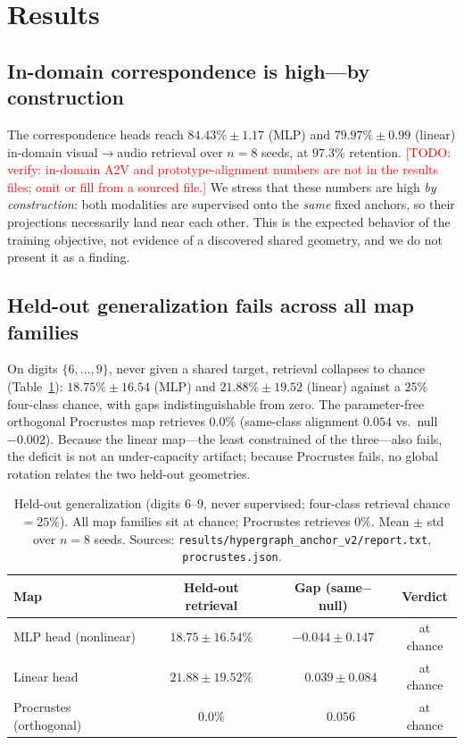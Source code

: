 \documentclass[conference]{IEEEtran}
\newcommand{\todo}[1]{\textcolor{red}{[TODO: #1]}}
\begin{document}
\section{Results}\label{sec:results}
\subsection{In-domain correspondence is high---by construction}
The correspondence heads reach $84.43\%\pm1.17$ (MLP) and $79.97\%\pm0.99$
(linear) in-domain visual$\to$audio retrieval over $n{=}8$ seeds, at
$97.3\%$ retention. \todo{verify: in-domain A2V and prototype-alignment
numbers are not in the results files; omit or fill from a sourced file.}
We stress that these numbers are high \emph{by construction}: both
modalities are supervised onto the \emph{same} fixed anchors, so their
projections necessarily land near each other. This is the expected behavior
of the training objective, not evidence of a discovered shared geometry, and
we do not present it as a finding.

\subsection{Held-out generalization fails across all map families}
On digits $\{6,\dots,9\}$, never given a shared target, retrieval collapses
to chance (Table~\ref{tab:heldout}): $18.75\%\pm16.54$ (MLP) and
$21.88\%\pm19.52$ (linear) against a $25\%$ four-class chance, with gaps
indistinguishable from zero. The parameter-free orthogonal Procrustes map
retrieves $0.0\%$ (same-class alignment $0.054$ vs.\ null $-0.002$). Because
the linear map---the least constrained of the three---also fails, the
deficit is not an under-capacity artifact; because Procrustes fails, no
global rotation relates the two held-out geometries.

\begin{table}[t]
\centering
\caption{Held-out generalization (digits $6$--$9$, never supervised; four-class
retrieval chance $=25\%$). All map families sit at chance; Procrustes
retrieves $0\%$. Mean $\pm$ std over $n{=}8$ seeds. Sources:
\texttt{results/hypergraph\_anchor\_v2/report.txt}, \texttt{procrustes.json}.}
\label{tab:heldout}
\begin{tabular}{lccc}
\toprule
Map & Held-out retrieval & Gap (same$-$null) & Verdict \\
\midrule
MLP head (nonlinear)    & $18.75 \pm 16.54\%$ & $-0.044 \pm 0.147$ & at chance \\
Linear head             & $21.88 \pm 19.52\%$ & $\phantom{-}0.039 \pm 0.084$ & at chance \\
Procrustes (orthogonal) & $0.0\%$             & $\phantom{-}0.056$           & at chance \\
\bottomrule
\end{tabular}
\end{table}
\end{document}
